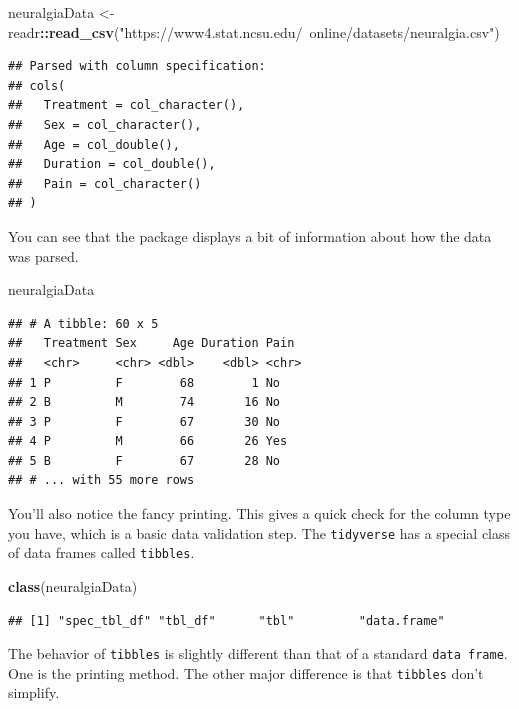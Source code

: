 \documentclass[
]{book}
\newenvironment{Shaded}{\begin{snugshade}}{\end{snugshade}}
\newcommand{\KeywordTok}[1]{\textcolor[rgb]{0.13,0.29,0.53}{\textbf{#1}}}
\newcommand{\NormalTok}[1]{#1}
\newcommand{\OperatorTok}[1]{\textcolor[rgb]{0.81,0.36,0.00}{\textbf{#1}}}
\newcommand{\StringTok}[1]{\textcolor[rgb]{0.31,0.60,0.02}{#1}}
\theoremstyle{definition}
\theoremstyle{definition}
\theoremstyle{definition}
\theoremstyle{remark}
\begin{document}
\begin{Shaded}
\begin{Highlighting}[]
\NormalTok{neuralgiaData <-}\StringTok{ }\NormalTok{readr}\OperatorTok{::}\KeywordTok{read_csv}\NormalTok{(}\StringTok{"https://www4.stat.ncsu.edu/~online/datasets/neuralgia.csv"}\NormalTok{)}
\end{Highlighting}
\end{Shaded}

\begin{verbatim}
## Parsed with column specification:
## cols(
##   Treatment = col_character(),
##   Sex = col_character(),
##   Age = col_double(),
##   Duration = col_double(),
##   Pain = col_character()
## )
\end{verbatim}

You can see that the package displays a bit of information about how the data was parsed.

\begin{Shaded}
\begin{Highlighting}[]
\NormalTok{neuralgiaData}
\end{Highlighting}
\end{Shaded}

\begin{verbatim}
## # A tibble: 60 x 5
##   Treatment Sex     Age Duration Pain 
##   <chr>     <chr> <dbl>    <dbl> <chr>
## 1 P         F        68        1 No   
## 2 B         M        74       16 No   
## 3 P         F        67       30 No   
## 4 P         M        66       26 Yes  
## 5 B         F        67       28 No   
## # ... with 55 more rows
\end{verbatim}

You'll also notice the fancy printing. This gives a quick check for the column type you have, which is a basic data validation step. The \texttt{tidyverse} has a special class of data frames called \texttt{tibbles}.

\begin{Shaded}
\begin{Highlighting}[]
\KeywordTok{class}\NormalTok{(neuralgiaData)}
\end{Highlighting}
\end{Shaded}

\begin{verbatim}
## [1] "spec_tbl_df" "tbl_df"      "tbl"         "data.frame"
\end{verbatim}

The behavior of \texttt{tibbles} is slightly different than that of a standard \texttt{data\ frame}. One is the printing method. The other major difference is that \texttt{tibbles} don't simplify.
\end{document}
